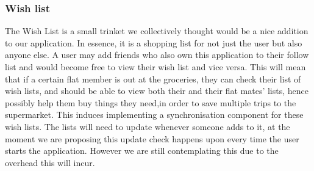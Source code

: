 \documentclass[a4paper,9t]{article}
\begin{document}
\subsubsection*{Wish list}
The Wish List is a small trinket we collectively thought would be a nice addition to our application. In essence, it is a shopping list for not just the user but also anyone else. A user may add friends who also own this application to their follow list and would become free to view their wish list and vice versa. This will mean that if a certain flat member is out at the groceries, they can check their list of wish lists, and should be able to view both their and their flat mates' lists, hence possibly help them buy things they need,in order to save multiple trips to the supermarket.
This induces implementing a synchronisation component for these wish lists. The lists will need to update whenever someone adds to it, at the moment we are proposing this update check happens upon every time the user starts the application. However we are still contemplating this due to the overhead this will incur.
\end{document}
